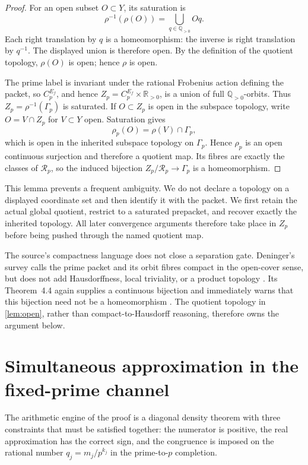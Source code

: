 \documentclass[11pt]{article}
\theoremstyle{definition}
\newcommand{\Q}{\mathbb{Q}}
\newcommand{\R}{\mathbb{R}}
\newcommand{\Rp}{\mathcal R_p}
\begin{document}
\begin{proof}
For an open subset \(O\subset Y\), its saturation is
\[
 \rho^{-1}(\rho(O))=\bigcup_{q\in\Q_{>0}}Oq.
\]
Each right translation by \(q\) is a homeomorphism: the inverse is right translation by \(q^{-1}\).  The displayed union is therefore open.  By the definition of the quotient topology, \(\rho(O)\) is open; hence \(\rho\) is open.

The prime label is invariant under the rational Frobenius action defining the packet, so \(C_p^{E_f}\), and hence \(Z_p=C_p^{E_f}\times\R_{>0}\), is a union of full \(\Q_{>0}\)-orbits.  Thus \(Z_p=\rho^{-1}(\Gamma_p)\) is saturated.  If \(O\subset Z_p\) is open in the subspace topology, write \(O=V\cap Z_p\) for \(V\subset Y\) open.  Saturation gives
\[
 \rho_p(O)=\rho(V)\cap\Gamma_p,
\]
which is open in the inherited subspace topology on \(\Gamma_p\).  Hence \(\rho_p\) is an open continuous surjection and therefore a quotient map.  Its fibres are exactly the classes of \(\Rp\), so the induced bijection \(Z_p/\Rp\to\Gamma_p\) is a homeomorphism.
\end{proof}

This lemma prevents a frequent ambiguity.  We do not declare a topology on a displayed coordinate set and then identify it with the packet.  We first retain the actual global quotient, restrict to a saturated prepacket, and recover exactly the inherited topology.  All later convergence arguments therefore take place in \(Z_p\) before being pushed through the named quotient map.

The source's compactness language does not close a separation gate.  Deninger's survey calls the prime packet and its orbit fibres compact in the open-cover sense, but does not add Hausdorffness, local triviality, or a product topology \cite[Theorem~4.2, physical pp.~11--12]{Deninger2024}.  Its Theorem~4.4 again supplies a continuous bijection and immediately warns that this bijection need not be a homeomorphism \cite[Theorem~4.4 and following sentence, physical pp.~12--13]{Deninger2024}.  The quotient topology in \cref{lem:open}, rather than compact-to-Hausdorff reasoning, therefore owns the argument below.

\section{Simultaneous approximation in the fixed-prime channel}\label{sec:crt}

The arithmetic engine of the proof is a diagonal density theorem with three constraints that must be satisfied together: the numerator is positive, the real approximation has the correct sign, and the congruence is imposed on the rational number \(q_j=m_j/p^{k_j}\) in the prime-to-\(p\) completion.
\end{document}
